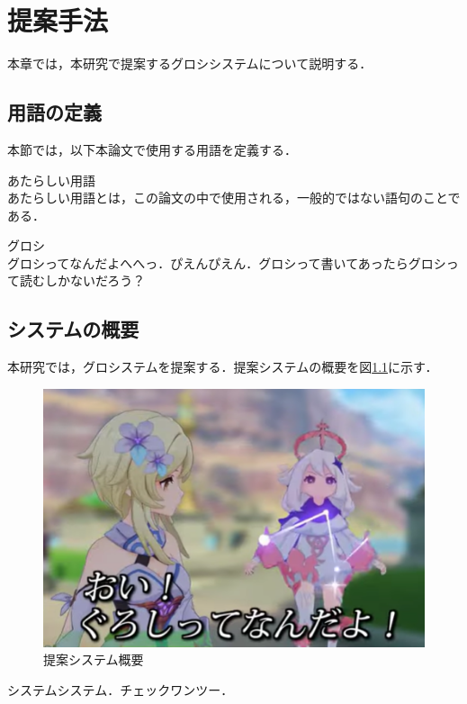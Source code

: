 \documentclass[main]{subfiles}
\begin{document}
\chapter{提案手法}
本章では，本研究で提案するグロシシステムについて説明する．

\section{用語の定義}
本節では，以下本論文で使用する用語を定義する．

\begin{definition}あたらしい用語\\
あたらしい用語とは，この論文の中で使用される，一般的ではない語句のことである．
\end{definition}

\begin{definition}グロシ\\
    グロシってなんだよへへっ．ぴえんぴえん．グロシって書いてあったらグロシって読むしかないだろう？
\end{definition}

\section{システムの概要}
本研究では，グロシステムを提案する．提案システムの概要を図\ref{fig:system_gaiyou_1}に示す．

\begin{figure}[htb]
    \centering
    \includegraphics[width=0.9\linewidth]{figures/system_gaiyou_1.png}
    \caption{提案システム概要}
    \label{fig:system_gaiyou_1}
\end{figure}

システムシステム．チェックワンツー．
\end{document}
